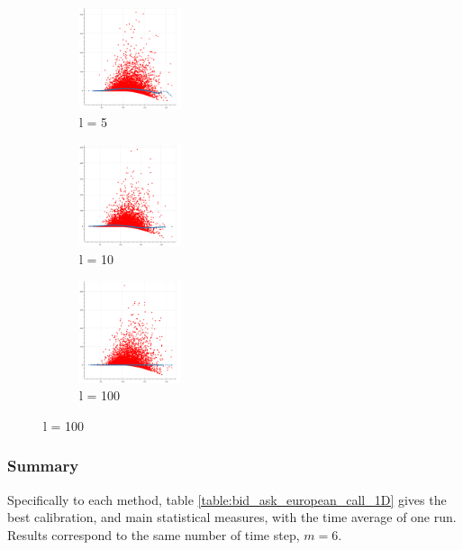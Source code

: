 \documentclass[english,11pt,openany]{report}
\theoremstyle{definition}
\theoremstyle{plain}
\theoremstyle{definition}
\begin{document}
\begin{figure}[H]
	\begin{subfigure}[t]{0.3\textwidth}
		\includegraphics[width=30mm]{kernel_regression/l=5.png}
		\caption{l = 5}
		\label{fig:d}
	\end{subfigure}
	\begin{subfigure}[t]{0.3\textwidth}
		\includegraphics[width=30mm]{kernel_regression/l=10.png}
		\caption{l = 10}
		\label{fig:e}
	\end{subfigure}
	\begin{subfigure}[t]{0.3\textwidth}
		\includegraphics[width=30mm]{kernel_regression/l=100.png}
		\caption{l = 100}
		\label{fig:f}
	\end{subfigure}
\end{figure}

\begin{figure}	
	
\end{figure}

\subsubsection{Summary}
 
Specifically to each method, table \eqref{table:bid_ask_european_call_1D} gives the best calibration, and main statistical measures, with the time average of one run.
Results correspond to the same number of time step, $m=6$.
\end{document}
